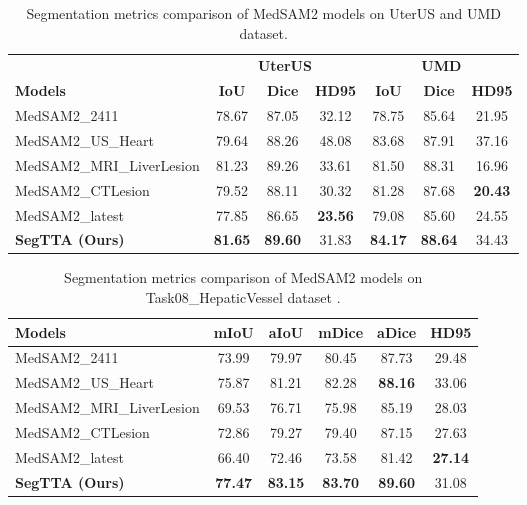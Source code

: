 \documentclass{article}
\begin{document}
\begin{table}[t]
\centering
\caption{Segmentation metrics comparison of MedSAM2 models on UterUS \cite{bones2024uterus} and UMD\cite{umd2024} dataset.}
\begin{tabular}{lccc|ccc}
\toprule
 & \multicolumn{3}{c}{\textbf{UterUS}} & \multicolumn{3}{c}{\textbf{UMD}} \\
\cmidrule(lr){2-4} 
\cmidrule(lr){5-7} 
 \textbf{Models} & \textbf{IoU} & \textbf{Dice} & \textbf{HD95} & \textbf{IoU} & \textbf{Dice} & \textbf{HD95} \\
\midrule
MedSAM2\_2411 & 78.67 & 87.05 & 32.12 & 78.75 & 85.64 & 21.95 \\
MedSAM2\_US\_Heart & 79.64 & 88.26 & 48.08 & 83.68 & 87.91 & 37.16 \\
MedSAM2\_MRI\_LiverLesion & 81.23 & 89.26 & 33.61 & 81.50 & 88.31 & 16.96 \\
MedSAM2\_CTLesion & 79.52 & 88.11 & 30.32 & 81.28 & 87.68 & \textbf{20.43} \\
MedSAM2\_latest & 77.85 & 86.65 & \textbf{23.56} & 79.08 & 85.60 & 24.55 \\
\midrule
\textbf{SegTTA (Ours)} & \textbf{81.65} & \textbf{89.60} & 31.83 & \textbf{84.17} & \textbf{88.64} & 34.43\\
\bottomrule
\end{tabular}
\label{tab:medsam2_UterUS_results}
\end{table}


\begin{table}[t]
\centering
\caption{Segmentation metrics comparison of MedSAM2 models on Task08\_HepaticVessel dataset \cite{task08hepatic2019}.}
\begin{tabular}{lccccc}
\toprule
\textbf{Models} & \textbf{mIoU} & \textbf{aIoU} & \textbf{mDice} & \textbf{aDice} & \textbf{HD95} \\
\midrule
MedSAM2\_2411            & 73.99 & 79.97 & 80.45 & 87.73 & 29.48 \\
MedSAM2\_US\_Heart               & 75.87 & 81.21 & 82.28 & \textbf{88.16} & 33.06 \\
MedSAM2\_MRI\_LiverLesion        & 69.53 & 76.71 & 75.98 & 85.19 & 28.03 \\
MedSAM2\_CTLesion                & 72.86 & 79.27 & 79.40 & 87.15 & 27.63 \\
MedSAM2\_latest         & 66.40 & 72.46 & 73.58 & 81.42 & \textbf{27.14} \\
\midrule
\textbf{SegTTA (Ours)} & \textbf{77.47} & \textbf{83.15} & \textbf{83.70} & \textbf{89.60} & 31.08\\
\bottomrule
\end{tabular}
\end{table}
\end{document}
